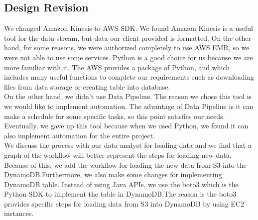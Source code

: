 \subsection{Design Revision}
We changed Amazon Kinesis to AWS SDK. We found Amazon Kinesis is a useful tool for the data stream, but data our client provided is formatted. On the other hand, for some reasons, we were authorized completely to use AWS EMR, so we were not able to use some services. Python is a good choice for us because we are more familiar with it. The AWS provides a package of Python, and which includes many useful functions to complete our requirements such as downloading files from data storage or creating table into database.\\ 

\noindent On the other hand, we didn’t use Data Pipeline. The reason we chose this tool is we would like to implement automation. The advantage of Data Pipeline is it can make a schedule for some specific tasks, so this point satisfies our needs. Eventually, we gave up this tool because when we used Python, we found it can also implement automation for the entire project.\\

\noindent We discuss the process with our data analyst for loading data and we find that a graph of the workflow will better represent the steps for loading new data. Because of this, we add the workflow for loading the new data from S3 into the DynamoDB.Furthermore, we also make some changes for implementing DynamoDB table. Instead of using Java APIs, we use the boto3 which is the Python SDK to implement the table in DynamoDB.The reason is the boto3 provides specific steps for loading data from S3 into DynamoDB by using EC2 instances.\\
